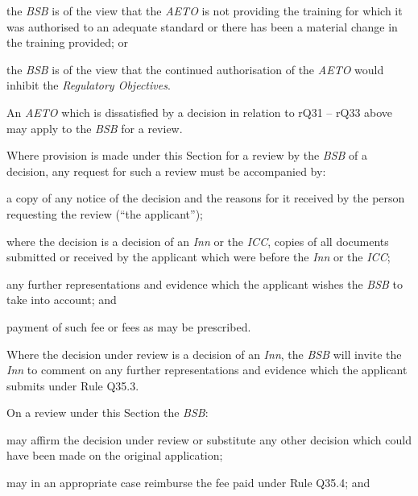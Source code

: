  \item the \emph{BSB} is of the view that the \emph{AETO} is not providing
the training for which it was authorised to an adequate standard or
there has been a material change in the training provided; or

 \item the \emph{BSB} is of the view that the continued authorisation of the
\emph{AETO} would inhibit the \emph{Regulatory Objectives}.\ln


An \emph{AETO} which is dissatisfied by a decision in relation to rQ31
-- rQ33 above may apply to the \emph{BSB} for a review.




Where provision is made under this Section for a review by the
\emph{BSB} of a decision, any request for such a review must be
accompanied by:
\nl
 \item a copy of any notice of the decision and the reasons for it received
by the person requesting the review (``the applicant'');

 \item where the decision is a decision of an \emph{Inn} or the \emph{ICC},
copies of all documents submitted or received by the applicant which
were before the \emph{Inn} or the \emph{ICC};

 \item any further representations and evidence which the applicant wishes
the \emph{BSB} to take into account; and

 \item payment of such fee or fees as may be prescribed.\ln


Where the decision under review is a decision of an \emph{Inn}, the
\emph{BSB} will invite the \emph{Inn} to comment on any further
representations and evidence which the applicant submits under Rule
Q35.3.


On a review under this Section the \emph{BSB}:

\nl  \item may affirm the decision under review or substitute any other decision
which could have been made on the original application;

 \item may in an appropriate case reimburse the fee paid under Rule Q35.4;
and

